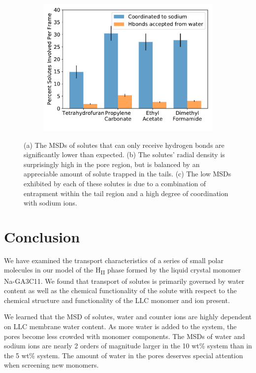 \documentclass[journal=jpcbfk,manuscript=article]{achemso}
\begin{document}
\begin{figure}[!htb]
\begin{subfigure}{0.325\textwidth}
  \includegraphics[width=\textwidth]{nondonor_hbonds.pdf}
  \caption{}\label{fig:nondonors_hbonds}
  \end{subfigure}
  \caption{(a) The MSDs of solutes that can only receive hydrogen bonds are
  significantly lower than expected. (b) The solutes' radial density
  is surprisingly high in the pore region, but is balanced by an appreciable
  amount of solute trapped in the tails. (c) The low MSDs exhibited by each of these
  solutes is due to a combination of entrapment within the tail region and a high 
  degree of coordination with sodium ions.}\label{fig:nondonors}
  \end{figure}

  \section{Conclusion}

  We have examined the transport characteristics of a series of small polar
  molecules in our model of the H\textsubscript{II} phase formed by the liquid 
  crystal monomer Na-GA3C11. We found that transport of solutes is primarily
  governed by water content as well as the chemical functionality of the solute
  with respect to the chemical structure and functionality of the LLC monomer 
  and ion present. 
  
  We learned that the MSD of solutes, water and counter ions are highly 
  dependent on LLC membrane water content. As more water is added to the system, 
  the pores become less crowded with monomer components. The MSDs of water and
  sodium ions are nearly 2 orders of magnitude larger in the 10 wt\% system 
  than in the 5 wt\% system. The amount of water in the pores deserves special
  attention when screening new monomers.
  
\end{document}
